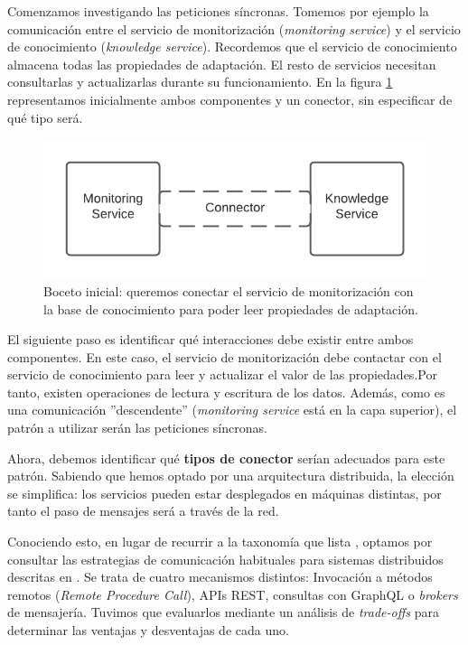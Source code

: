 Comenzamos investigando las peticiones síncronas. Tomemos por ejemplo la comunicación entre el servicio de monitorización (\emph{monitoring service}) y el servicio de conocimiento (\emph{knowledge service}). Recordemos que el servicio de conocimiento almacena todas las propiedades de adaptación. El resto de servicios necesitan consultarlas y actualizarlas durante su funcionamiento. En la figura \ref{fig:monitor-knowledge-initial} representamos inicialmente ambos componentes y un conector, sin especificar de qué tipo será.

\begin{figure}[htb]
  \centering
  \includegraphics{03_arquitectura/images/Monitor-Knowledge-Initial-Connector}
  \caption{Boceto inicial: queremos conectar el servicio de monitorización con la base de conocimiento para poder leer propiedades de adaptación.}
  \label{fig:monitor-knowledge-initial}
\end{figure}

El siguiente paso es identificar qué interacciones debe existir entre ambos componentes. En este caso, el servicio de monitorización debe contactar con el servicio de conocimiento para leer y actualizar el valor de las propiedades.Por tanto, existen operaciones de lectura y escritura de los datos. Además, como es una comunicación ''descendente'' (\emph{monitoring service} está en la capa superior), el patrón a utilizar serán las peticiones síncronas.

Ahora, debemos identificar qué \textbf{tipos de conector} serían adecuados para este patrón. Sabiendo que hemos optado por una arquitectura distribuida, la elección se simplifica: los servicios pueden estar desplegados en máquinas distintas, por tanto el paso de mensajes será a través de la red.

Conociendo esto, en lugar de recurrir a la taxonomía que lista \cite{mehtaTaxonomySoftwareConnectors2000}, optamos por consultar las estrategias de comunicación habituales para sistemas distribuidos descritas en \cite{newmanBuildingMicroservicesDesigning2021}. Se trata de cuatro mecanismos distintos: Invocación a métodos remotos (\emph{Remote Procedure Call}), APIs REST, consultas con GraphQL o \emph{brokers} de mensajería. Tuvimos que evaluarlos mediante un análisis de \emph{trade-offs} para determinar las ventajas y desventajas de cada uno.

